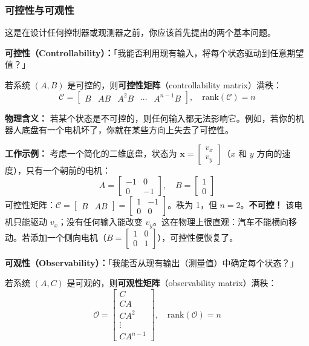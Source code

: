 \subsubsection{可控性与可观性}

这是在设计任何控制器或观测器之前，你应该首先提出的两个基本问题。

\textbf{可控性（Controllability）：}「我能否利用现有输入，将每个状态驱动到任意期望值？」

若系统 $(A, B)$ 是可控的，则\textbf{可控性矩阵}（controllability matrix）满秩：
\begin{equation}
\mathcal{C} = \begin{bmatrix} B & AB & A^2B & \cdots & A^{n-1}B \end{bmatrix}, \quad \text{rank}(\mathcal{C}) = n
\end{equation}

\textbf{物理含义：} 若某个状态是不可控的，则任何输入都无法影响它。例如，若你的机器人底盘有一个电机坏了，你就在某些方向上失去了可控性。

\textbf{工作示例：} 考虑一个简化的二维底盘，状态为 $\mathbf{x} = \begin{bmatrix} v_x \\ v_y \end{bmatrix}$（$x$ 和 $y$ 方向的速度），只有一个朝前的电机：
\[
A = \begin{bmatrix} -1 & 0 \\ 0 & -1 \end{bmatrix}, \quad B = \begin{bmatrix} 1 \\ 0 \end{bmatrix}
\]
可控性矩阵：$\mathcal{C} = \begin{bmatrix} B & AB \end{bmatrix} = \begin{bmatrix} 1 & -1 \\ 0 & 0 \end{bmatrix}$。秩为 1，但 $n = 2$。\textbf{不可控！} 该电机只能驱动 $v_x$；没有任何输入能改变 $v_y$。这在物理上很直观：汽车不能横向移动。若添加一个侧向电机（$B = \begin{bmatrix} 1 & 0 \\ 0 & 1 \end{bmatrix}$），可控性便恢复了。

\textbf{可观性（Observability）：}「我能否从现有输出（测量值）中确定每个状态？」

若系统 $(A, C)$ 是可观的，则\textbf{可观性矩阵}（observability matrix）满秩：
\begin{equation}
\mathcal{O} = \begin{bmatrix} C \\ CA \\ CA^2 \\ \vdots \\ CA^{n-1} \end{bmatrix}, \quad \text{rank}(\mathcal{O}) = n
\end{equation}

